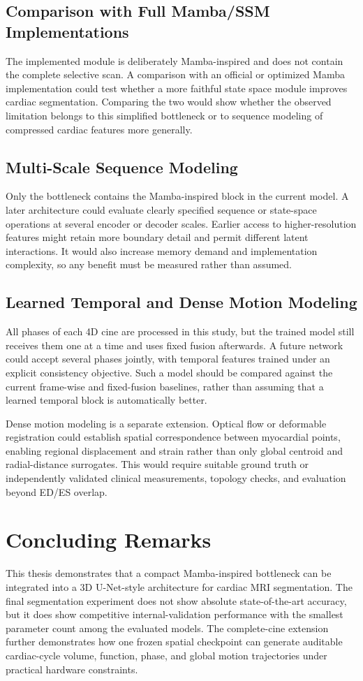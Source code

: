 \subsection{Comparison with Full Mamba/SSM Implementations}
The implemented module is deliberately Mamba-inspired and does not contain the complete selective scan. A comparison with an official or optimized Mamba implementation could test whether a more faithful state space module improves cardiac segmentation. Comparing the two would show whether the observed limitation belongs to this simplified bottleneck or to sequence modeling of compressed cardiac features more generally.

\subsection{Multi-Scale Sequence Modeling}
Only the bottleneck contains the Mamba-inspired block in the current model. A later architecture could evaluate clearly specified sequence or state-space operations at several encoder or decoder scales. Earlier access to higher-resolution features might retain more boundary detail and permit different latent interactions. It would also increase memory demand and implementation complexity, so any benefit must be measured rather than assumed.

\subsection{Learned Temporal and Dense Motion Modeling}
All phases of each 4D cine are processed in this study, but the trained model still receives them one at a time and uses fixed fusion afterwards. A future network could accept several phases jointly, with temporal features trained under an explicit consistency objective. Such a model should be compared against the current frame-wise and fixed-fusion baselines, rather than assuming that a learned temporal block is automatically better.

Dense motion modeling is a separate extension. Optical flow or deformable registration could establish spatial correspondence between myocardial points, enabling regional displacement and strain rather than only global centroid and radial-distance surrogates. This would require suitable ground truth or independently validated clinical measurements, topology checks, and evaluation beyond ED/ES overlap.

\section{Concluding Remarks}
This thesis demonstrates that a compact Mamba-inspired bottleneck can be integrated into a 3D U-Net-style architecture for cardiac MRI segmentation. The final segmentation experiment does not show absolute state-of-the-art accuracy, but it does show competitive internal-validation performance with the smallest parameter count among the evaluated models. The complete-cine extension further demonstrates how one frozen spatial checkpoint can generate auditable cardiac-cycle volume, function, phase, and global motion trajectories under practical hardware constraints.

